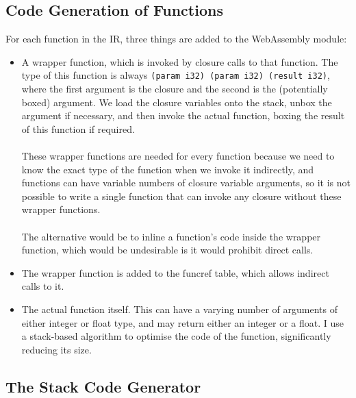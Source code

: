 \documentclass[12pt,twoside,notitlepage]{report}
\newcommand{\wainline}{\texttt}
\newcommand\note[1]{\textcolor{blue}{#1}}
\begin{document}
\subsection{Code Generation of Functions}
For each function in the IR, three things are added to the WebAssembly module:
\begin{itemize}
	\item A wrapper function, which is invoked by closure calls to that function. The type of this function is always \wainline{(param i32) (param i32) (result i32)}, where the first argument is the closure and the second is the (potentially boxed) argument. We load the closure variables onto the stack, unbox the argument if necessary, and then invoke the actual function, boxing the result of this function if required.
	\\\\
	These wrapper functions are needed for every function because we need to know the exact type of the function when we invoke it indirectly, and functions can have variable numbers of closure variable arguments, so it is not possible to write a single function that can invoke any closure without these wrapper functions.
	\\\\
	The alternative would be to inline a function's code inside the wrapper function, which would be undesirable is it would prohibit direct calls.
	\item The wrapper function is added to the funcref table, which allows indirect calls to it.
	\item The actual function itself. This can have a varying number of arguments of either integer or float type, and may return either an integer or a float. I use a stack-based algorithm to optimise the code of the function, significantly reducing its size.
\end{itemize}

\subsection{The Stack Code Generator}
%
\end{document}
